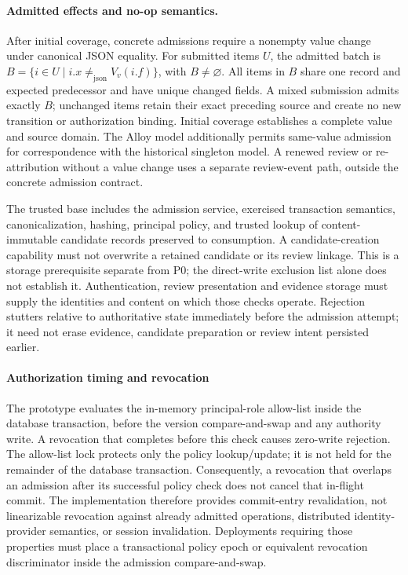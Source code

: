 \documentclass[11pt,a4paper]{article}
\newcommand{\neqc}{\mathrel{\neq_{\mathrm{json}}}}
\begin{document}
\paragraph{Admitted effects and no-op semantics.}
After initial coverage, concrete admissions require a nonempty value change under canonical JSON equality. For submitted items $U$, the admitted batch is $B=\{i\in U\mid i.x\neqc V_v(i.f)\}$, with $B\ne\varnothing$. All items in $B$ share one record and expected predecessor and have unique changed fields. A mixed submission admits exactly $B$; unchanged items retain their exact preceding source and create no new transition or authorization binding. Initial coverage establishes a complete value and source domain. The Alloy model additionally permits same-value admission for correspondence with the historical singleton model. A renewed review or re-attribution without a value change uses a separate review-event path, outside the concrete admission contract.

The trusted base includes the admission service, exercised transaction semantics, canonicalization, hashing, principal policy, and trusted lookup of content-immutable candidate records preserved to consumption. A candidate-creation capability must not overwrite a retained candidate or its review linkage. This is a storage prerequisite separate from P0; the direct-write exclusion list alone does not establish it. Authentication, review presentation and evidence storage must supply the identities and content on which those checks operate. Rejection stutters relative to authoritative state immediately before the admission attempt; it need not erase evidence, candidate preparation or review intent persisted earlier.

\paragraph{Authorization timing and revocation}
\label{app:authorization-timing}
The prototype evaluates the in-memory principal-role allow-list inside the database transaction, before the version compare-and-swap and any authority write. A revocation that completes before this check causes zero-write rejection. The allow-list lock protects only the policy lookup/update; it is not held for the remainder of the database transaction. Consequently, a revocation that overlaps an admission after its successful policy check does not cancel that in-flight commit. The implementation therefore provides commit-entry revalidation, not linearizable revocation against already admitted operations, distributed identity-provider semantics, or session invalidation. Deployments requiring those properties must place a transactional policy epoch or equivalent revocation discriminator inside the admission compare-and-swap.
\end{document}
